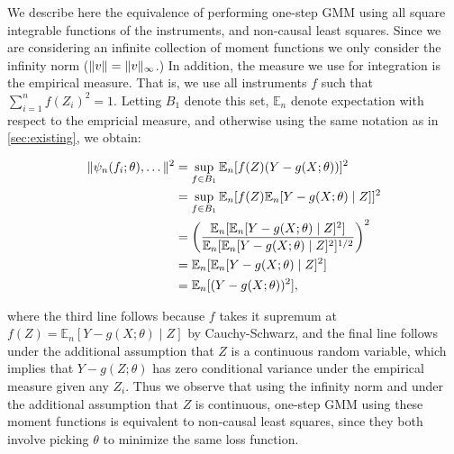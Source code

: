 \documentclass{article}
\theoremstyle{plain}
\theoremstyle{definition}
\begin{document}
We describe here the equivalence of performing one-step GMM using all square integrable functions of the instruments, and non-causal least squares. Since we are considering an infinite collection of moment functions we only consider the infinity norm (\ie $\|v\| = \|v\|_\infty$.) In addition, the measure we use for integration is the empirical measure. That is, we use all instruments $f$ such that $\sum_{i=1}^n f(Z_i)^2 = 1$. Letting $B_1$ denote this set, $\mathbb{E}_n$ denote expectation with respect to the empricial measure, and otherwise using the same notation as in \cref{sec:existing}, we obtain:

\begin{align*}
    \| \psi_n(f_i;\theta), \ldots\|^2 &= \sup_{f \in B_1} \mathbb{E}_n[f(Z) (Y - g(X;\theta))]^2 \\
    &= \sup_{f \in B_1} \mathbb{E}_n[f(Z) \mathbb{E}_n[Y - g(X;\theta) \mid Z]]^2 \\
    &= \left( \frac{\mathbb{E}_n[\mathbb{E}_n[Y - g(X;\theta) \mid Z]^2]}{\mathbb{E}_n[\mathbb{E}_n[Y - g(X;\theta) \mid Z]^2]^{1/2}} \right)^2 \\
    &=  \mathbb{E}_n[\mathbb{E}_n[Y - g(X;\theta) \mid Z]^2] \\
    &=  \mathbb{E}_n[(Y - g(X;\theta))^2],
\end{align*}

where the third line follows because $f$ takes it supremum at $f(Z) = \mathbb{E}_n[Y - g(X;\theta) \mid Z]$ by Cauchy-Schwarz, and the final line follows under the additional assumption that $Z$ is a continuous random variable, which implies that $Y - g(Z;\theta)$ has zero conditional variance under the empirical measure given any $Z_i$. Thus we observe that using the infinity norm and under the additional assumption that $Z$ is continuous, one-step GMM using these moment functions is equivalent to non-causal least squares, since they both involve picking $\theta$ to minimize the same loss function.
\end{document}
